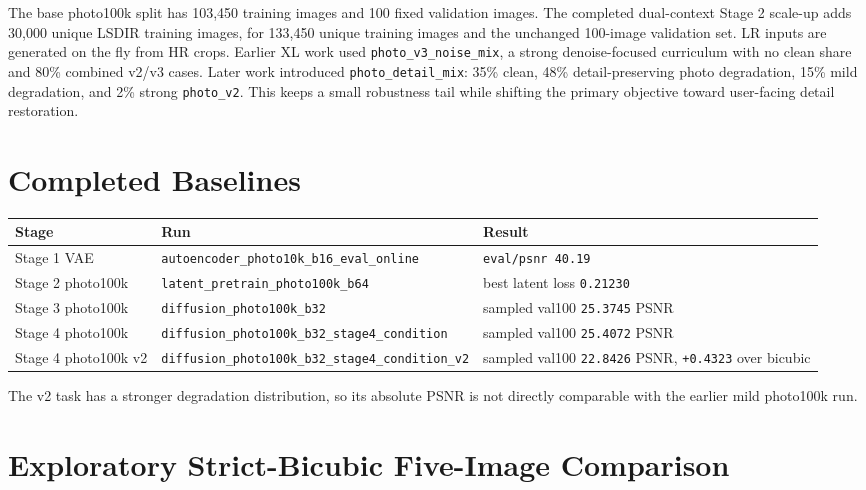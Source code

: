 \documentclass[
  10pt,
]{article}
\begin{document}
The base photo100k split has 103,450 training images and 100 fixed
validation images. The completed dual-context Stage 2 scale-up adds
30,000 unique LSDIR training images, for 133,450 unique training images
and the unchanged 100-image validation set. LR inputs are generated on
the fly from HR crops. Earlier XL work used
\texttt{photo\_v3\_noise\_mix}, a strong denoise-focused curriculum with
no clean share and 80\% combined v2/v3 cases. Later work introduced
\texttt{photo\_detail\_mix}: 35\% clean, 48\% detail-preserving photo
degradation, 15\% mild degradation, and 2\% strong \texttt{photo\_v2}.
This keeps a small robustness tail while shifting the primary objective
toward user-facing detail restoration.

\hypertarget{completed-baselines}{%
\section{Completed Baselines}\label{completed-baselines}}

\begin{longtable}[]{@{}lll@{}}
\toprule\noalign{}
Stage & Run & Result \\
\midrule\noalign{}
\endhead
\bottomrule\noalign{}
\endlastfoot
Stage 1 VAE & \texttt{autoencoder\_photo10k\_b16\_eval\_online} &
\texttt{eval/psnr\ 40.19} \\
Stage 2 photo100k & \texttt{latent\_pretrain\_photo100k\_b64} & best
latent loss \texttt{0.21230} \\
Stage 3 photo100k & \texttt{diffusion\_photo100k\_b32} & sampled val100
\texttt{25.3745} PSNR \\
Stage 4 photo100k &
\texttt{diffusion\_photo100k\_b32\_stage4\_condition} & sampled val100
\texttt{25.4072} PSNR \\
Stage 4 photo100k v2 &
\texttt{diffusion\_photo100k\_b32\_stage4\_condition\_v2} & sampled
val100 \texttt{22.8426} PSNR, \texttt{+0.4323} over bicubic \\
\end{longtable}

The v2 task has a stronger degradation distribution, so its absolute
PSNR is not directly comparable with the earlier mild photo100k run.

\hypertarget{exploratory-strict-bicubic-five-image-comparison}{%
\section{Exploratory Strict-Bicubic Five-Image
Comparison}\label{exploratory-strict-bicubic-five-image-comparison}}
\end{document}
